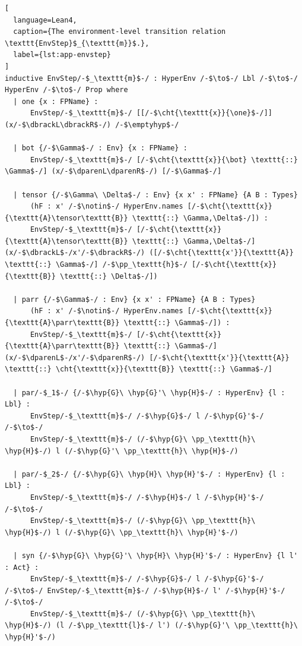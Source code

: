 \begin{lstlisting}[
  language=Lean4,
  caption={The environment-level transition relation \texttt{EnvStep}$_{\texttt{m}}$.},
  label={lst:app-envstep}
]
inductive EnvStep/-$_\texttt{m}$-/ : HyperEnv /-$\to$-/ Lbl /-$\to$-/ HyperEnv /-$\to$-/ Prop where
  | one {x : FPName} :
      EnvStep/-$_\texttt{m}$-/ [[/-$\cht{\texttt{x}}{\one}$-/]] (x/-$\dbrackL\dbrackR$-/) /-$\emptyhyp$-/

  | bot {/-$\Gamma$-/ : Env} {x : FPName} :
      EnvStep/-$_\texttt{m}$-/ [/-$\cht{\texttt{x}}{\bot} \texttt{::} \Gamma$-/] (x/-$\dparenL\dparenR$-/) [/-$\Gamma$-/] 

  | tensor {/-$\Gamma\ \Delta$-/ : Env} {x x' : FPName} {A B : Types} 
      (hF : x' /-$\notin$-/ HyperEnv.names [/-$\cht{\texttt{x}}{\texttt{A}\tensor\texttt{B}} \texttt{::} \Gamma,\Delta$-/]) :
      EnvStep/-$_\texttt{m}$-/ [/-$\cht{\texttt{x}}{\texttt{A}\tensor\texttt{B}} \texttt{::} \Gamma,\Delta$-/] (x/-$\dbrackL$-/x'/-$\dbrackR$-/) ([/-$\cht{\texttt{x'}}{\texttt{A}} \texttt{::} \Gamma$-/] /-$\pp_\texttt{h}$-/ [/-$\cht{\texttt{x}}{\texttt{B}} \texttt{::} \Delta$-/])

  | parr {/-$\Gamma$-/ : Env} {x x' : FPName} {A B : Types}
      (hF : x' /-$\notin$-/ HyperEnv.names [/-$\cht{\texttt{x}}{\texttt{A}\parr\texttt{B}} \texttt{::} \Gamma$-/]) :
      EnvStep/-$_\texttt{m}$-/ [/-$\cht{\texttt{x}}{\texttt{A}\parr\texttt{B}} \texttt{::} \Gamma$-/] (x/-$\dparenL$-/x'/-$\dparenR$-/) [/-$\cht{\texttt{x'}}{\texttt{A}} \texttt{::} \cht{\texttt{x}}{\texttt{B}} \texttt{::} \Gamma$-/]

  | par/-$_1$-/ {/-$\hyp{G}\ \hyp{G}'\ \hyp{H}$-/ : HyperEnv} {l : Lbl} :
      EnvStep/-$_\texttt{m}$-/ /-$\hyp{G}$-/ l /-$\hyp{G}'$-/ /-$\to$-/ 
      EnvStep/-$_\texttt{m}$-/ (/-$\hyp{G}\ \pp_\texttt{h}\ \hyp{H}$-/) l (/-$\hyp{G}'\ \pp_\texttt{h}\ \hyp{H}$-/)

  | par/-$_2$-/ {/-$\hyp{G}\ \hyp{H}\ \hyp{H}'$-/ : HyperEnv} {l : Lbl} :
      EnvStep/-$_\texttt{m}$-/ /-$\hyp{H}$-/ l /-$\hyp{H}'$-/ /-$\to$-/ 
      EnvStep/-$_\texttt{m}$-/ (/-$\hyp{G}\ \pp_\texttt{h}\ \hyp{H}$-/) l (/-$\hyp{G}\ \pp_\texttt{h}\ \hyp{H}'$-/)

  | syn {/-$\hyp{G}\ \hyp{G}'\ \hyp{H}\ \hyp{H}'$-/ : HyperEnv} {l l' : Act} :
      EnvStep/-$_\texttt{m}$-/ /-$\hyp{G}$-/ l /-$\hyp{G}'$-/ /-$\to$-/ EnvStep/-$_\texttt{m}$-/ /-$\hyp{H}$-/ l' /-$\hyp{H}'$-/ /-$\to$-/ 
      EnvStep/-$_\texttt{m}$-/ (/-$\hyp{G}\ \pp_\texttt{h}\ \hyp{H}$-/) (l /-$\pp_\texttt{l}$-/ l') (/-$\hyp{G}'\ \pp_\texttt{h}\ \hyp{H}'$-/)


\end{lstlisting}
